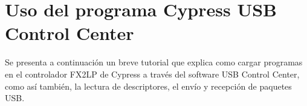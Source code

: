 \chapter{Uso del programa Cypress USB Control Center}
	\label{app:cyusb}
	Se presenta a continuación un breve tutorial que explica como cargar programas en el controlador FX2LP de Cypress a través del software USB Control Center, como así también, la lectura de descriptores, el envío y recepción de paquetes USB.\\
	
	